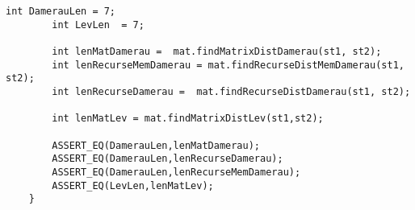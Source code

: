 \begin{lstlisting}[label=lst:unit_tests, caption=Модульные тесты]
        int DamerauLen = 7;
        int LevLen  = 7;
        
        int lenMatDamerau =  mat.findMatrixDistDamerau(st1, st2);
        int lenRecurseMemDamerau = mat.findRecurseDistMemDamerau(st1, st2);
        int lenRecurseDamerau =  mat.findRecurseDistDamerau(st1, st2);
        
        int lenMatLev = mat.findMatrixDistLev(st1,st2);
        
        ASSERT_EQ(DamerauLen,lenMatDamerau);
        ASSERT_EQ(DamerauLen,lenRecurseDamerau);
        ASSERT_EQ(DamerauLen,lenRecurseMemDamerau);
        ASSERT_EQ(LevLen,lenMatLev);
    }
 \end{lstlisting}
 
 
 
 
 
 
 
 